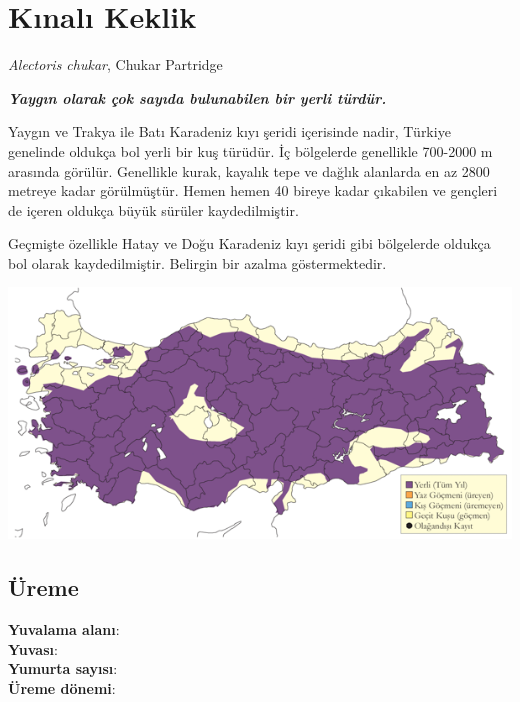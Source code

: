 \documentclass[
  letterpaper,
  DIV=11,
  numbers=noendperiod]{scrreprt}
\begin{document}
\section{Kınalı Keklik}\label{kux131nalux131-keklik}

\emph{Alectoris chukar}, Chukar Partridge

\textbf{\emph{Yaygın olarak çok sayıda bulunabilen bir yerli türdür.}}

Yaygın ve Trakya ile Batı Karadeniz kıyı şeridi içerisinde nadir,
Türkiye genelinde oldukça bol yerli bir kuş türüdür. İç bölgelerde
genellikle 700-2000 m arasında görülür. Genellikle kurak, kayalık tepe
ve dağlık alanlarda en az 2800 metreye kadar görülmüştür. Hemen hemen 40
bireye kadar çıkabilen ve gençleri de içeren oldukça büyük sürüler
kaydedilmiştir.

Geçmişte özellikle Hatay ve Doğu Karadeniz kıyı şeridi gibi bölgelerde
oldukça bol olarak kaydedilmiştir. Belirgin bir azalma göstermektedir.

\includegraphics{images/harita_Page_039.png}

\subsection{\texorpdfstring{\textbf{Üreme}}{Üreme}}\label{uxfcreme-3}

\textbf{Yuvalama alanı}:\\
\textbf{Yuvası}:\\
\textbf{Yumurta sayısı}:\\
\textbf{Üreme dönemi}:
\end{document}
